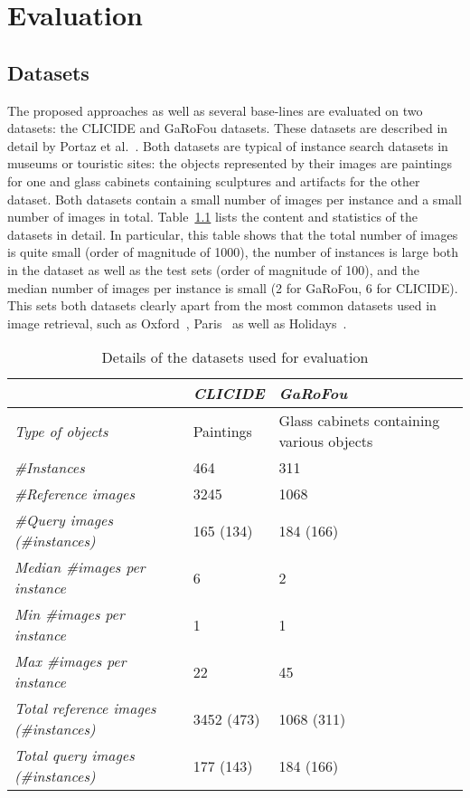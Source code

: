 
\chapter{Evaluation}\label{sec:evaluation}
\section{Datasets}\label{sec:datasets}
The proposed approaches as well as several base-lines are evaluated
on two datasets: the CLICIDE and GaRoFou datasets. These datasets are
described in detail by Portaz et al.~\cite{portaz_construction_2017}.
Both datasets are typical of instance search datasets
in museums or touristic sites: the objects represented by their images
are paintings for one and glass cabinets containing sculptures and artifacts
for the other dataset. Both datasets contain a small number of images
per instance and a small number of images in total.
Table~\ref{tab:datasets} lists the content and statistics of the datasets
in detail. In particular, this table shows that the total number of images
is quite small (order of magnitude of 1000), the number of instances
is large both in the dataset as well as the test sets (order of magnitude
of 100), and the median number of images per instance is small
(2 for GaRoFou, 6 for CLICIDE). This sets both datasets clearly apart
from the most common datasets used in image retrieval, such as
Oxford~\cite{philbin_object_2007}, Paris~\cite{philbin_lost_2008}
as well as Holidays~\cite{jegou_hamming_2008}.

\begin{table}
\begin{tabular}{|l|l|l|}
\hline & \emph{CLICIDE} & \emph{GaRoFou}\\
\hline \emph{Type of objects} & Paintings & Glass cabinets
containing various objects\\
\hline \emph{\#Instances} & 464 & 311\\
\hline \emph{\#Reference images} & 3245 & 1068\\
\hline \emph{\#Query images (\#instances)} & 165 (134) & 184 (166)\\
\hline \emph{Median \#images per instance} & 6 & 2\\
\hline \emph{Min \#images per instance} & 1 & 1\\
\hline \emph{Max \#images per instance} & 22 & 45\\
\hline \emph{Total reference images (\#instances)} & 3452 (473) & 1068 (311)\\
\hline \emph{Total query images (\#instances)} & 177 (143) & 184 (166)\\
\hline
\end{tabular}
\caption{Details of the datasets used for evaluation\label{tab:datasets}}
\end{table}

